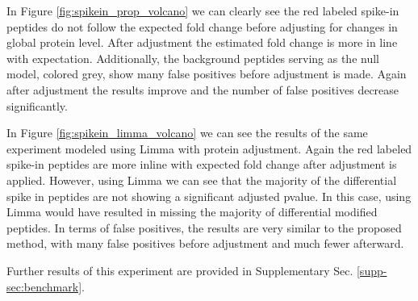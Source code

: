 \documentclass[mcp]{article}
\numberwithin{figure}{section} %
\numberwithin{table}{section}
\def\todo#1{{\color{red}[#1]}}
\begin{document}
In Figure \ref{fig:spikein_prop_volcano} we can clearly see the red labeled spike-in peptides do not follow the expected fold change before adjusting for changes in global protein level. After adjustment the estimated fold change is more in line with expectation. Additionally, the background peptides serving as the null model, colored grey, show many false positives before adjustment is made. Again after adjustment the results improve and the number of false positives decrease significantly. 

In Figure \ref{fig:spikein_limma_volcano} we can see the results of the same experiment modeled using Limma with protein adjustment. Again the red labeled spike-in peptides are more inline with expected fold change after adjustment is applied. However, using Limma we can see that the majority of the differential spike in peptides are not showing a significant adjusted pvalue. In this case, using Limma would have resulted in missing the majority of differential modified peptides.  In terms of false positives, the results are very similar to the proposed method, with many false positives before adjustment and much fewer afterward.

Further results of this experiment are provided in Supplementary Sec. \ref{supp-sec:benchmark}. 


\end{document}
